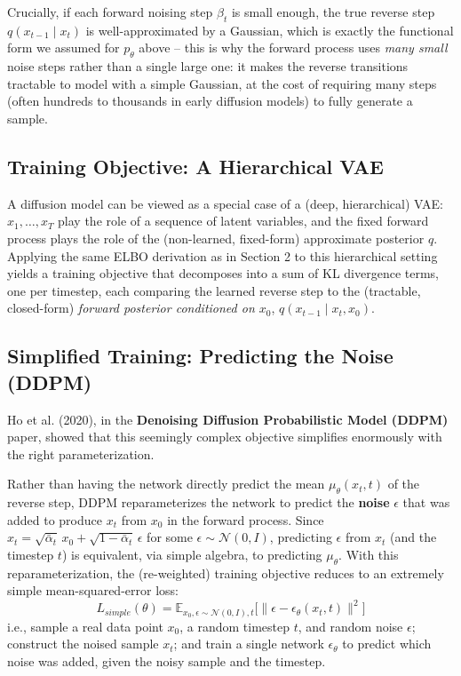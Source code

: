 \documentclass[12pt,a4paper]{article}
\begin{document}
\begin{keyidea}
Crucially, if each forward noising step $\beta_t$ is small enough, the true reverse step $q(x_{t-1}\mid x_t)$ is well-approximated by a Gaussian, which is exactly the functional form we assumed for $p_\theta$ above -- this is why the forward process uses \emph{many small} noise steps rather than a single large one: it makes the reverse transitions tractable to model with a simple Gaussian, at the cost of requiring many steps (often hundreds to thousands in early diffusion models) to fully generate a sample.
\end{keyidea}

\subsection{Training Objective: A Hierarchical VAE}

A diffusion model can be viewed as a special case of a (deep, hierarchical) VAE: $x_1, \ldots, x_T$ play the role of a sequence of latent variables, and the fixed forward process plays the role of the (non-learned, fixed-form) approximate posterior $q$. Applying the same ELBO derivation as in Section 2 to this hierarchical setting yields a training objective that decomposes into a sum of KL divergence terms, one per timestep, each comparing the learned reverse step to the (tractable, closed-form) \emph{forward posterior conditioned on $x_0$}, $q(x_{t-1}\mid x_t, x_0)$.

\subsection{Simplified Training: Predicting the Noise (DDPM)}

Ho et al. (2020), in the \textbf{Denoising Diffusion Probabilistic Model (DDPM)} paper, showed that this seemingly complex objective simplifies enormously with the right parameterization.

\begin{keyidea}
Rather than having the network directly predict the mean $\mu_\theta(x_t,t)$ of the reverse step, DDPM reparameterizes the network to predict the \textbf{noise} $\epsilon$ that was added to produce $x_t$ from $x_0$ in the forward process. Since $x_t = \sqrt{\bar\alpha_t}\,x_0 + \sqrt{1-\bar\alpha_t}\,\epsilon$ for some $\epsilon \sim \mathcal{N}(0,I)$, predicting $\epsilon$ from $x_t$ (and the timestep $t$) is equivalent, via simple algebra, to predicting $\mu_\theta$. With this reparameterization, the (re-weighted) training objective reduces to an extremely simple mean-squared-error loss:
\[
L_{simple}(\theta) = \mathbb{E}_{x_0, \epsilon \sim \mathcal{N}(0,I), t}\Big[\big\|\epsilon - \epsilon_\theta(x_t, t)\big\|^2\Big]
\]
i.e., sample a real data point $x_0$, a random timestep $t$, and random noise $\epsilon$; construct the noised sample $x_t$; and train a single network $\epsilon_\theta$ to predict which noise was added, given the noisy sample and the timestep.
\end{keyidea}
\end{document}
